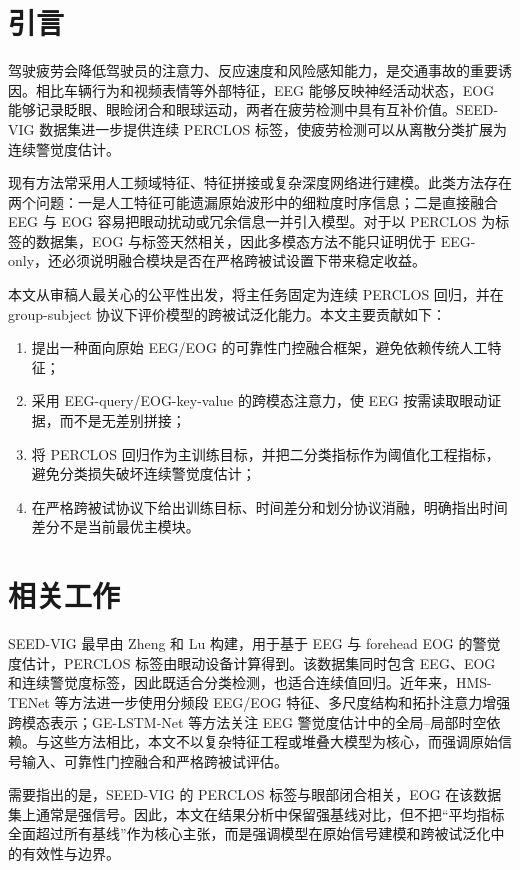 \documentclass[UTF8,a4paper,11pt,fontset=windows]{ctexart}
\begin{document}
\section{引言}
驾驶疲劳会降低驾驶员的注意力、反应速度和风险感知能力，是交通事故的重要诱因。相比车辆行为和视频表情等外部特征，EEG 能够反映神经活动状态，EOG 能够记录眨眼、眼睑闭合和眼球运动，两者在疲劳检测中具有互补价值。SEED-VIG 数据集进一步提供连续 PERCLOS 标签，使疲劳检测可以从离散分类扩展为连续警觉度估计。

现有方法常采用人工频域特征、特征拼接或复杂深度网络进行建模。此类方法存在两个问题：一是人工特征可能遗漏原始波形中的细粒度时序信息；二是直接融合 EEG 与 EOG 容易把眼动扰动或冗余信息一并引入模型。对于以 PERCLOS 为标签的数据集，EOG 与标签天然相关，因此多模态方法不能只证明优于 EEG-only，还必须说明融合模块是否在严格跨被试设置下带来稳定收益。

本文从审稿人最关心的公平性出发，将主任务固定为连续 PERCLOS 回归，并在 group-subject 协议下评价模型的跨被试泛化能力。本文主要贡献如下：
\begin{enumerate}
  \item 提出一种面向原始 EEG/EOG 的可靠性门控融合框架，避免依赖传统人工特征；
  \item 采用 EEG-query/EOG-key-value 的跨模态注意力，使 EEG 按需读取眼动证据，而不是无差别拼接；
  \item 将 PERCLOS 回归作为主训练目标，并把二分类指标作为阈值化工程指标，避免分类损失破坏连续警觉度估计；
  \item 在严格跨被试协议下给出训练目标、时间差分和划分协议消融，明确指出时间差分不是当前最优主模块。
\end{enumerate}

\section{相关工作}
SEED-VIG 最早由 Zheng 和 Lu 构建，用于基于 EEG 与 forehead EOG 的警觉度估计，PERCLOS 标签由眼动设备计算得到。该数据集同时包含 EEG、EOG 和连续警觉度标签，因此既适合分类检测，也适合连续值回归。近年来，HMS-TENet 等方法进一步使用分频段 EEG/EOG 特征、多尺度结构和拓扑注意力增强跨模态表示；GE-LSTM-Net 等方法关注 EEG 警觉度估计中的全局--局部时空依赖。与这些方法相比，本文不以复杂特征工程或堆叠大模型为核心，而强调原始信号输入、可靠性门控融合和严格跨被试评估。

需要指出的是，SEED-VIG 的 PERCLOS 标签与眼部闭合相关，EOG 在该数据集上通常是强信号。因此，本文在结果分析中保留强基线对比，但不把“平均指标全面超过所有基线”作为核心主张，而是强调模型在原始信号建模和跨被试泛化中的有效性与边界。
\end{document}
